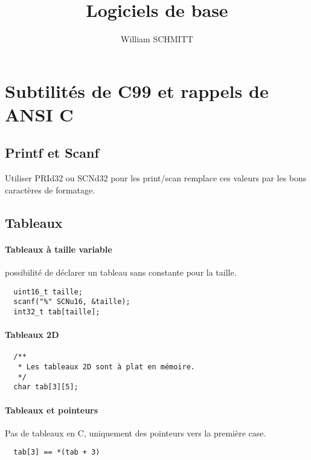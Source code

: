 \documentclass{article}
\title{Logiciels de base}
\author{William SCHMITT}
\begin{document}
\maketitle

\section{Subtilités de C99 et rappels de ANSI C}

\subsection{Printf et Scanf}

Utiliser PRId32 ou SCNd32 pour les print/scan remplace ces valeurs par les bons
caractères de formatage.

\subsection{Tableaux}

\paragraph{Tableaux à taille variable} possibilité de déclarer un tableau sans
constante pour la taille.
\begin{verbatim}
  uint16_t taille;
  scanf("%" SCNu16, &taille);
  int32_t tab[taille];
\end{verbatim}

\paragraph{Tableaux 2D}
\begin{verbatim}
  /**
   * Les tableaux 2D sont à plat en mémoire.
   */
  char tab[3][5];
\end{verbatim}

\paragraph{Tableaux et pointeurs}


Pas de tableaux en C, uniquement des pointeurs vers la première case.
\begin{verbatim}
  tab[3] == *(tab + 3)
\end{verbatim}
\end{document}
